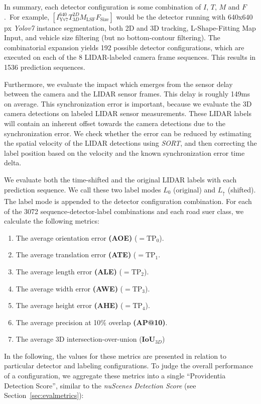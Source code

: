 In summary, each detector configuration is some combination of $I$, $T$, $M$ and $F$.\ For example, $\left[I^{640}_\text{Yv7}T^{2D}_{3D}M_\text{LSF}F_\text{Size}\right]$ would be the detector running with 640x640 px \textit{Yolov7} instance segmentation, both 2D and 3D tracking, L-Shape-Fitting Map Input, and vehicle size filtering (but no bottom-contour filtering).
The combinatorial expansion yields 192 possible detector configurations, which are executed on each of the 8 LIDAR-labeled camera frame sequences.
This results in 1536 prediction sequences.

Furthermore, we evaluate the impact which emerges from the sensor delay between the camera and the LIDAR sensor frames.
This delay is roughly 149ms on average.
This synchronization error is important, because we evaluate the 3D camera detections on labeled LIDAR sensor measurements.
These LIDAR labels will contain an inherent offset towards the camera detections due to the synchronization error.
We check whether the error can be reduced by estimating the spatial velocity of the LIDAR detections using \textit{SORT}, and then correcting the label position based on the velocity and the known synchronization error time delta.

We evaluate both the time-shifted and the original LIDAR labels with each prediction sequence.
We call these two label modes $L_0$ (original) and $L_{\uparrow}$ (shifted).
The label mode is appended to the detector configuration combination.
For each of the 3072 sequence-detector-label combinations and each road suer class, we calculate the following metrics:

\begin{enumerate}
    \item The average orientation error \textbf{(AOE)} ($=\text{TP}_0$).
    \item The average translation error \textbf{(ATE)} ($=\text{TP}_1$.
    \item The average length error \textbf{(ALE)} ($=\text{TP}_2$).
    \item The average width error \textbf{(AWE)} ($=\text{TP}_3$).
    \item The average height error \textbf{(AHE)} ($=\text{TP}_4$).
    \item The average precision at 10\% overlap \textbf{(AP@10)}.
    \item The average 3D intersection-over-union ($\mathbf{IoU}_{3D}$)
\end{enumerate}

In the following, the values for these metrics are presented in relation to particular detector and labeling configurations.
To judge the overall performance of a configuration, we aggregate these metrics into a single \enquote{Providentia Detection Score}, similar to the \textit{nuScenes Detection Score} (see Section~\ref{sec:evalmetrics}):

